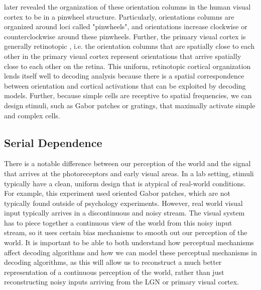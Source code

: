 \documentclass[../main.tex]{subfiles}
\begin{document}
\cite{Yacoub10607} later revealed the organization of these orientation columns in the human visual cortex to be in a pinwheel structure. Particularly, orientations columns are organized around loci called "pinwheels", and orientations increase clockwise or counterclockwise around these pinwheels. Further, the primary visual cortex is generally retinotopic \cite{Engel_97}, i.e. the orientation columns that are spatially close to each other in the primary visual cortex represent orientations that arrive spatially close to each other on the retina. This uniform, retinotopic cortical organization lends itself well to decoding analysis because there is a spatial correspondence between orientation and cortical activations that can be exploited by decoding models. Further, because simple cells are receptive to spatial frequencies, we can design stimuli, such as Gabor patches or gratings, that maximally activate simple and complex cells. 

\subsection{Serial Dependence}
There is a notable difference between our perception of the world and the signal that arrives at the photoreceptors and early visual areas. In a lab setting, stimuli typically have a clean, uniform design that is atypical of real-world conditions. For example, this experiment used oriented Gabor patches, which are not typically found outside of psychology experiments. However, real world visual input typically arrives in a discontinuous and noisy stream. The visual system has to piece together a continuous view of the world from this noisy input stream, so it uses certain bias mechanisms to smooth out our perception of the world. It is important to be able to both understand how perceptual mechanisms affect decoding algorithms and how we can model these perceptual mechanisms in decoding algorithms, as this will allow us to reconstruct a much better representation of a continuous perception of the world, rather than just reconstructing noisy inputs arriving from the LGN or primary visual cortex.
\end{document}
